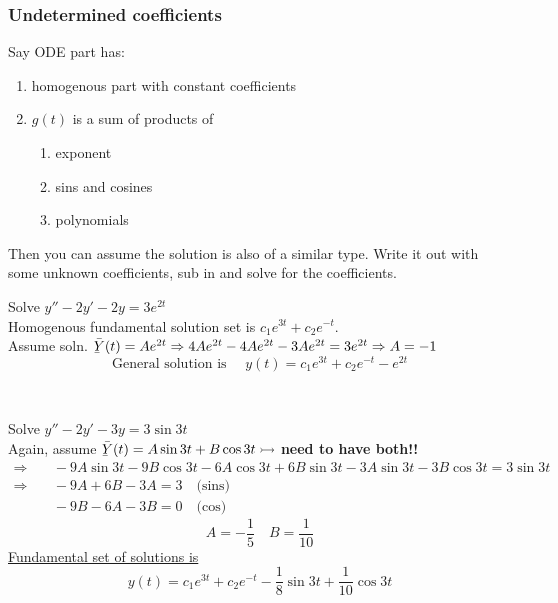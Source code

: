 \subsubsection*{Undetermined coefficients}
Say ODE part has:
\begin{enumerate}[label=\protect\circled{\Roman*}]
	\item homogenous part with constant coefficients
	\item $g(t)$ is a sum of products of
	\begin{enumerate}[label=\protect\circled{\alph*}]
		\item exponent
		\item sins and cosines
		\item polynomials
	\end{enumerate}
\end{enumerate}
Then you can assume the solution is also of a similar type. Write it out with some unknown coefficients, sub in and solve for the coefficients.
\begin{example-N}
	Solve $y'' - 2y' -2y = 3e^{2t}$\\
	Homogenous fundamental solution set is $c_1 e^{3t} + c_2 e^{-t}$.\\
	Assume soln. $\Ylines(t) = Ae^{2t} \Rightarrow 4Ae^{2t} - 4Ae^{2t} - 3Ae^{2t} = 3e^{2t} \Rightarrow A = -1$\\
	\begin{equation*}
		\text{General solution is } \quad y(t) = c_1e^{3t} + c_2e^{-t} - e^{2t}
	\end{equation*}
\end{example-N}
\redhline\\
\begin{example-N}
	Solve $y'' - 2y' -3y = 3 \sin 3t$\\
	Again, assume $\Ylines(t) = A\sin 3t + B \cos 3t \rightarrowtail$ \textbf{need to have both!!}
	\begin{align*}
		\Rightarrow & \quad -9A \sin 3t - 9B \cos 3t - 6A \cos 3t + 6B \sin 3t - 3A \sin 3t - 3B \cos 3t = 3 \sin 3t\\
		\Rightarrow & \quad -9A + 6B - 3A = 3 \quad \text{(sins)}\\
		& \quad -9B - 6A - 3B = 0 \quad \text{(cos)}
	\end{align*}
	\begin{equation*}
		\boxed{A = -\frac{1}{5} \quad B = \frac{1}{10}}
	\end{equation*}
	\underline{Fundamental set of solutions is}
	\begin{equation*}
		\boxed{y(t) = c_1 e^{3t} + c_2e^{-t} - \frac{1}{8} \sin 3t + \frac{1}{10} \cos 3t}
	\end{equation*}
\end{example-N}